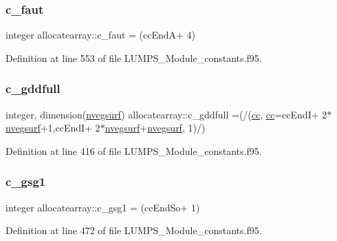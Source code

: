 \subsubsection{\texorpdfstring{c\+\_\+faut}{c\_faut}}
{\footnotesize\ttfamily integer allocatearray\+::c\+\_\+faut = (cc\+EndA+ 4)}



Definition at line 553 of file L\+U\+M\+P\+S\+\_\+\+Module\+\_\+constants.\+f95.

\mbox{\label{namespaceallocatearray_a0539fd468872f90f631dfbdb953a6806}} 
\subsubsection{\texorpdfstring{c\+\_\+gddfull}{c\_gddfull}}
{\footnotesize\ttfamily integer, dimension(\hyperlink{namespaceallocatearray_abb987c3b35dd321963fd53d38f10236f}{nvegsurf}) allocatearray\+::c\+\_\+gddfull =(/(\hyperlink{namespaceallocatearray_ac863c81704eb507dee10f5e10741e10c}{cc}, \hyperlink{namespaceallocatearray_ac863c81704eb507dee10f5e10741e10c}{cc}=cc\+EndI+ 2$\ast$\hyperlink{namespaceallocatearray_abb987c3b35dd321963fd53d38f10236f}{nvegsurf}+1,cc\+EndI+ 2$\ast$\hyperlink{namespaceallocatearray_abb987c3b35dd321963fd53d38f10236f}{nvegsurf}+\hyperlink{namespaceallocatearray_abb987c3b35dd321963fd53d38f10236f}{nvegsurf}, 1)/)}



Definition at line 416 of file L\+U\+M\+P\+S\+\_\+\+Module\+\_\+constants.\+f95.

\mbox{\label{namespaceallocatearray_a10397ddbe69224c2751100ffad7d60ed}} 
\subsubsection{\texorpdfstring{c\+\_\+gsg1}{c\_gsg1}}
{\footnotesize\ttfamily integer allocatearray\+::c\+\_\+gsg1 = (cc\+End\+So+ 1)}



Definition at line 472 of file L\+U\+M\+P\+S\+\_\+\+Module\+\_\+constants.\+f95.

\mbox{\label{namespaceallocatearray_a2b115354208d6b09535bda0cee499316}} 
